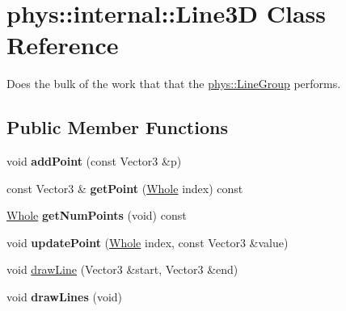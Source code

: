 \hypertarget{classphys_1_1internal_1_1Line3D}{
\section{phys::internal::Line3D Class Reference}
\label{d4/db5/classphys_1_1internal_1_1Line3D}
}


Does the bulk of the work that that the \hyperlink{classphys_1_1LineGroup}{phys::LineGroup} performs.  


\subsection*{Public Member Functions}
\begin{DoxyCompactItemize}
\item 
\hypertarget{classphys_1_1internal_1_1Line3D_aeb3b828b35b4c8ed76158285be6ddc67}{
void {\bfseries addPoint} (const Vector3 \&p)}
\label{d4/db5/classphys_1_1internal_1_1Line3D_aeb3b828b35b4c8ed76158285be6ddc67}

\item 
\hypertarget{classphys_1_1internal_1_1Line3D_a190af0e38be28297ed2f6a7aecf0c316}{
const Vector3 \& {\bfseries getPoint} (\hyperlink{namespacephys_a460f6bc24c8dd347b05e0366ae34f34a}{Whole} index) const }
\label{d4/db5/classphys_1_1internal_1_1Line3D_a190af0e38be28297ed2f6a7aecf0c316}

\item 
\hypertarget{classphys_1_1internal_1_1Line3D_ab72a9dab3a355035c24c15e4a737ea2f}{
\hyperlink{namespacephys_a460f6bc24c8dd347b05e0366ae34f34a}{Whole} {\bfseries getNumPoints} (void) const }
\label{d4/db5/classphys_1_1internal_1_1Line3D_ab72a9dab3a355035c24c15e4a737ea2f}

\item 
\hypertarget{classphys_1_1internal_1_1Line3D_a4b2dec1619e4456ab0cb034ad34eb9d1}{
void {\bfseries updatePoint} (\hyperlink{namespacephys_a460f6bc24c8dd347b05e0366ae34f34a}{Whole} index, const Vector3 \&value)}
\label{d4/db5/classphys_1_1internal_1_1Line3D_a4b2dec1619e4456ab0cb034ad34eb9d1}

\item 
void \hyperlink{classphys_1_1internal_1_1Line3D_a0320e600b9f363036c63eb47527bb854}{drawLine} (Vector3 \&start, Vector3 \&end)
\item 
\hypertarget{classphys_1_1internal_1_1Line3D_a008f0874c2213002e0c39330561f80f2}{
void {\bfseries drawLines} (void)}
\label{d4/db5/classphys_1_1internal_1_1Line3D_a008f0874c2213002e0c39330561f80f2}


\end{DoxyCompactItemize}
